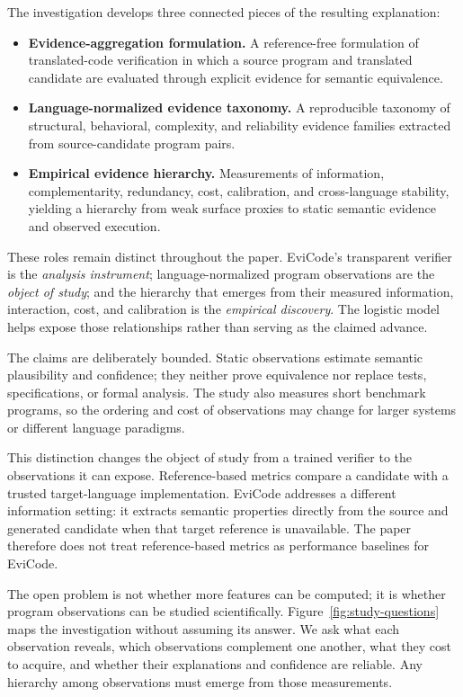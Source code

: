 ﻿\documentclass[conference]{IEEEtran}
\begin{document}
The investigation develops three connected pieces of the resulting explanation:
\begin{itemize}
\item \textbf{Evidence-aggregation formulation.} A reference-free formulation of translated-code verification in which a source program and translated candidate are evaluated through explicit evidence for semantic equivalence.
\item \textbf{Language-normalized evidence taxonomy.} A reproducible taxonomy of structural, behavioral, complexity, and reliability evidence families extracted from source-candidate program pairs.
\item \textbf{Empirical evidence hierarchy.} Measurements of information, complementarity, redundancy, cost, calibration, and cross-language stability, yielding a hierarchy from weak surface proxies to static semantic evidence and observed execution.
\end{itemize}
These roles remain distinct throughout the paper. EviCode's transparent verifier is the \emph{analysis instrument}; language-normalized program observations are the \emph{object of study}; and the hierarchy that emerges from their measured information, interaction, cost, and calibration is the \emph{empirical discovery}. The logistic model helps expose those relationships rather than serving as the claimed advance.

The claims are deliberately bounded. Static observations estimate semantic plausibility and confidence; they neither prove equivalence nor replace tests, specifications, or formal analysis. The study also measures short benchmark programs, so the ordering and cost of observations may change for larger systems or different language paradigms.

This distinction changes the object of study from a trained verifier to the observations it can expose. Reference-based metrics compare a candidate with a trusted target-language implementation. EviCode addresses a different information setting: it extracts semantic properties directly from the source and generated candidate when that target reference is unavailable. The paper therefore does not treat reference-based metrics as performance baselines for EviCode.

The open problem is not whether more features can be computed; it is whether program observations can be studied scientifically. Figure~\ref{fig:study-questions} maps the investigation without assuming its answer. We ask what each observation reveals, which observations complement one another, what they cost to acquire, and whether their explanations and confidence are reliable. Any hierarchy among observations must emerge from those measurements.
\end{document}
